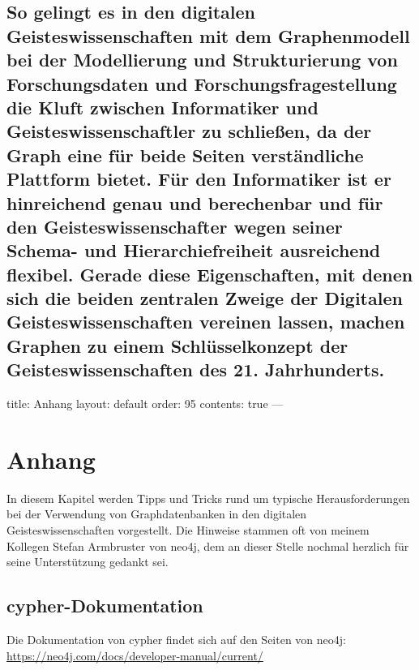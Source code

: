 \documentclass[12pt,ngerman,]{article}
\begin{document}
\subsection{So gelingt es in den digitalen Geisteswissenschaften mit dem
Graphenmodell bei der Modellierung und Strukturierung von
Forschungsdaten und Forschungsfragestellung die Kluft zwischen
Informatiker und Geisteswissenschaftler zu schließen, da der Graph eine
für beide Seiten verständliche Plattform bietet. Für den Informatiker
ist er hinreichend genau und berechenbar und für den
Geisteswissenschafter wegen seiner Schema- und Hierarchiefreiheit
ausreichend flexibel. Gerade diese Eigenschaften, mit denen sich die
beiden zentralen Zweige der Digitalen Geisteswissenschaften vereinen
lassen, machen Graphen zu einem Schlüsselkonzept der
Geisteswissenschaften des 21.
Jahrhunderts.}\label{so-gelingt-es-in-den-digitalen-geisteswissenschaften-mit-dem-graphenmodell-bei-der-modellierung-und-strukturierung-von-forschungsdaten-und-forschungsfragestellung-die-kluft-zwischen-informatiker-und-geisteswissenschaftler-zu-schlieuxdfen-da-der-graph-eine-fuxfcr-beide-seiten-verstuxe4ndliche-plattform-bietet.-fuxfcr-den-informatiker-ist-er-hinreichend-genau-und-berechenbar-und-fuxfcr-den-geisteswissenschafter-wegen-seiner-schema--und-hierarchiefreiheit-ausreichend-flexibel.-gerade-diese-eigenschaften-mit-denen-sich-die-beiden-zentralen-zweige-der-digitalen-geisteswissenschaften-vereinen-lassen-machen-graphen-zu-einem-schluxfcsselkonzept-der-geisteswissenschaften-des-21.-jahrhunderts.}

title: Anhang layout: default order: 95 contents: true ---

\section{Anhang}\label{anhang}

In diesem Kapitel werden Tipps und Tricks rund um typische
Herausforderungen bei der Verwendung von Graphdatenbanken in den
digitalen Geisteswissenschaften vorgestellt. Die Hinweise stammen oft
von meinem Kollegen Stefan Armbruster von neo4j, dem an dieser Stelle
nochmal herzlich für seine Unterstützung gedankt sei.

\subsection{cypher-Dokumentation}\label{cypher-dokumentation}

Die Dokumentation von cypher findet sich auf den Seiten von neo4j:
\url{https://neo4j.com/docs/developer-manual/current/}
\end{document}
